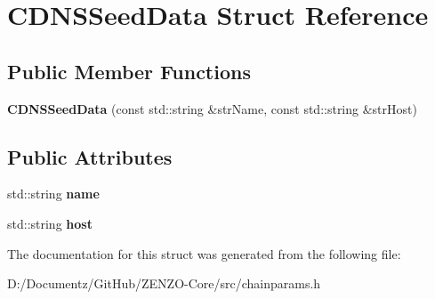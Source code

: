 \hypertarget{struct_c_d_n_s_seed_data}{}\section{C\+D\+N\+S\+Seed\+Data Struct Reference}
\label{struct_c_d_n_s_seed_data}
\subsection*{Public Member Functions}
\begin{DoxyCompactItemize}
\item 
\mbox{\label{struct_c_d_n_s_seed_data_a4152b594beb9800fb7611e3c47f03499}} 
{\bfseries C\+D\+N\+S\+Seed\+Data} (const std\+::string \&str\+Name, const std\+::string \&str\+Host)
\end{DoxyCompactItemize}
\subsection*{Public Attributes}
\begin{DoxyCompactItemize}
\item 
\mbox{\label{struct_c_d_n_s_seed_data_a2cf084b163340bd62b67e765799f1fdd}} 
std\+::string {\bfseries name}
\item 
\mbox{\label{struct_c_d_n_s_seed_data_a70f5da8568016651cfb7ec7dbf01b3f0}} 
std\+::string {\bfseries host}
\end{DoxyCompactItemize}


The documentation for this struct was generated from the following file\+:\begin{DoxyCompactItemize}
\item 
D\+:/\+Documentz/\+Git\+Hub/\+Z\+E\+N\+Z\+O-\/\+Core/src/chainparams.\+h\end{DoxyCompactItemize}
